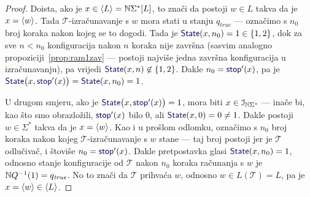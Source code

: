 \begin{proof}
Doista, ako je $x\in\langle L\rangle={\mathbb N}\Sigma^*[L]$, to znači da postoji $w\in L$ takva da je $x=\langle w\rangle$. Tada $\mathcal T$-izračunavanje s $w$ mora stati u stanju $q_\mathit{true}$ --- označimo s $n_0$ broj koraka nakon kojeg se to dogodi. Tada je $\f{State}(x,n_0)=1\in\{1,2\}$, dok za sve $n<n_0$ konfiguracija nakon $n$ koraka nije završna (sasvim analogno propoziciji~\ref{prop:ram1zav} --- postoji najviše jedna završna konfiguracija u izračunavanju), pa vrijedi $\f{State}(x,n)\not\in\{1,2\}$. Dakle $n_0=\f{stop}'(x)$, pa je $\f{State}\bigl(x,\f{stop}'(x)\bigr)=\f{State}(x,n_0)=1$.

U drugom smjeru, ako je $\f{State}\bigl(x,\f{stop}'(x)\bigr)=1$, mora biti $x\in\mathcal I_{{\mathbb N}\Sigma^*}$ --- inače bi, kao što smo obrazložili, $\f{stop}'(x)$ bilo $0$, ali $\f{State}(x,0)=0\not=1$. Dakle postoji $w\in\Sigma^*$ takva da je $x=\langle w\rangle$. Kao i u prošlom odlomku, označimo s $n_0$ broj koraka nakon kojeg $\mathcal T$-izračunavanje s $w$ stane --- taj broj postoji jer je $\mathcal T$ odlučivač, i štoviše $n_0=\f{stop}'(x)$. Dakle pretpostavka glasi $\f{State}(x,n_0)=1$, odnosno stanje konfiguracije od $\mathcal T$ nakon $n_0$ koraka računanja s $w$ je ${\mathbb N} Q^{-1}(1)=q_\mathit{true}$. No to znači da $\mathcal T$ prihvaća $w$, odnosno $w\in L(\mathcal T)=L$, pa je $x=\langle w\rangle\in\langle L\rangle$.
\end{proof}

